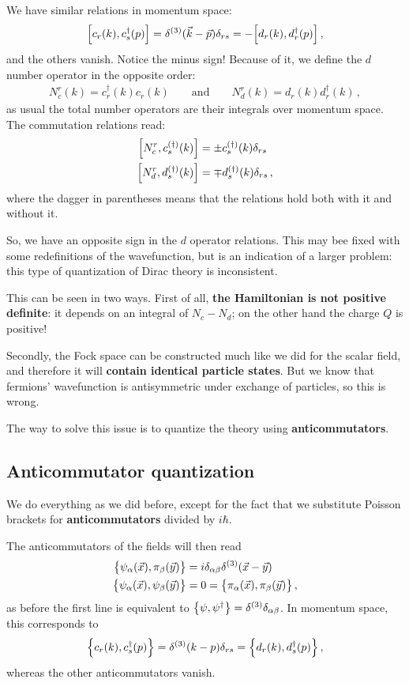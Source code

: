 \documentclass[main.tex]{subfiles}
\begin{document}
We have similar relations in momentum space: 
%
\begin{align}
\qty[c_r (k), c_s ^\dag (p)] = \delta^{(3)} (\vec{k} - \vec{p}) \delta_{rs} = - \qty[d_r (k), d_r ^\dag (p)]
\,,
\end{align}
%
and the others vanish. Notice the minus sign! 
Because of it, we define the \(d\) number operator in the opposite order: 
%
\begin{align}
N_c^{r} (k) = c_r ^\dag (k) c_r (k)
\qquad \text{and} \qquad
N_d^{r} (k) = d_r (k) d_r  ^\dag (k)
\,,
\end{align}
%
as usual the total number operators are their integrals over momentum space. 
The commutation relations read: 
%
\begin{align}
\qty[N_c^{r}, c_s ^{(\dag)} (k)] &= \pm c_s ^{(\dag)} (k) \delta_{rs} \\
\qty[N_d^{r}, d_s ^{(\dag)} (k)] &= \mp d_s ^{(\dag)} (k) \delta_{rs}
\,,
\end{align}
%
where the dagger in parentheses means that the relations hold both with it and without it. 

So, we have an opposite sign in the \(d\) operator relations. This may bee fixed with some redefinitions of the wavefunction, but is an indication of a larger problem: this type of quantization of Dirac theory is inconsistent. 

This can be seen in two ways. First of all, \textbf{the Hamiltonian is not positive definite}: it depends on an integral of \(N_c - N_d\); on the other hand the charge \(Q\) is positive!

Secondly, the Fock space can be constructed much like we did for the scalar field, and therefore it will \textbf{contain identical particle states}. But we know that fermions' wavefunction is antisymmetric under exchange of particles, so this is wrong. 

The way to solve this issue is to quantize the theory using \textbf{anticommutators}. 

\subsection{Anticommutator quantization}

We do everything as we did before, except for the fact that we substitute Poisson brackets for \textbf{anticommutators} divided by \(i \hbar\).

The anticommutators of the fields will then read 
%
\begin{align}
\qty{\psi_{\alpha } (\vec{x}), \pi_{\beta } (\vec{y})} &= i \delta_{\alpha \beta } \delta^{(3)} (\vec{x}-\vec{y})  \\
\qty{\psi_{\alpha }(\vec{x}), \psi_{\beta }(\vec{y})} 
&= 0 = 
\qty{\pi_{\alpha }(\vec{x}), \pi_{\beta }(\vec{y})} 
\,,
\end{align}
%
as before the first line is equivalent to \(\qty{\psi, \psi ^\dag} = \delta^{(3)} \delta_{\alpha \beta }\).
In momentum space, this corresponds to 
%
\begin{align}
\qty{c_r (k), c_s ^\dag (p)} = \delta^{(3)} (k-p) \delta_{rs} = \qty{d_r (k), d_s ^\dag (p)}
\,,
\end{align}
%
whereas the other anticommutators vanish. 
\end{document}
